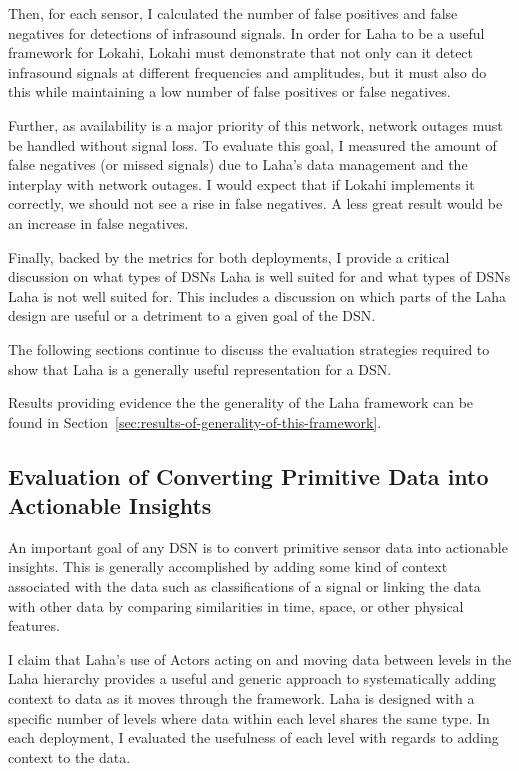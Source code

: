 Then, for each sensor, I calculated the number of false positives and false negatives for detections of infrasound signals. In order for Laha to be a useful framework for Lokahi, Lokahi must demonstrate that not only can it detect infrasound signals at different frequencies and amplitudes, but it must also do this while maintaining a low number of false positives or false negatives.

Further, as availability is a major priority of this network, network outages must be handled without signal loss. To evaluate this goal, I measured the amount of false negatives (or missed signals) due to Laha's data management and the interplay with network outages. I would expect that if Lokahi implements it correctly, we should not see a rise in false negatives. A less great result would be an increase in false negatives.

Finally, backed by the metrics for both deployments, I provide a critical discussion on what types of DSNs Laha is well suited for and what types of DSNs Laha is not well suited for. This includes a discussion on which parts of the Laha design are useful or a detriment to a given goal of the DSN\@.

The following sections continue to discuss the evaluation strategies required to show that Laha is a generally useful representation for a DSN\@.

Results providing evidence the the generality of the Laha framework can be found in Section~\ref{sec:results-of-generality-of-this-framework}.

\subsection{Evaluation of Converting Primitive Data into Actionable Insights}\label{subsec:evaluation-of-converting-primitive-data-into-actionable-insights}
An important goal of any DSN is to convert primitive sensor data into actionable insights. This is generally accomplished by adding some kind of context associated with the data such as classifications of a signal or linking the data with other data by comparing similarities in time, space, or other physical features.

I claim that Laha's use of Actors acting on and moving data between levels in the Laha hierarchy provides a useful and generic approach to systematically adding context to data as it moves through the framework. Laha is designed with a specific number of levels where data within each level shares the same type. In each deployment, I evaluated the usefulness of each level with regards to adding context to the data.

